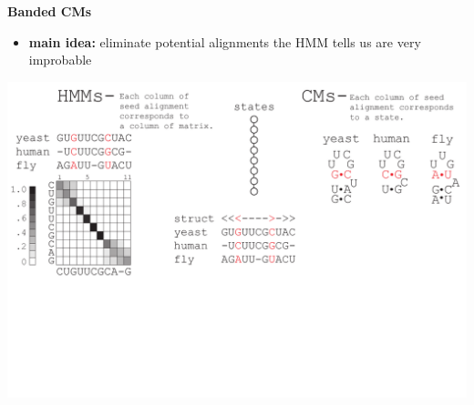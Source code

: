 \documentclass[landscape]{slides}
\begin{document}
\begin{slide}
\begin{center}
\large
\textbf{Banded CMs}
\end{center}
\medskip
\small
\begin{itemize}
\item
\textbf{main idea:} eliminate potential alignments the HMM tells us are very improbable
\end{itemize}
\begin{center}
\includegraphics[width=8in]{figs/post_hmm_to_cm_map2_layer2}
\end{center}
\vfill
\end{slide}
\end{document}
